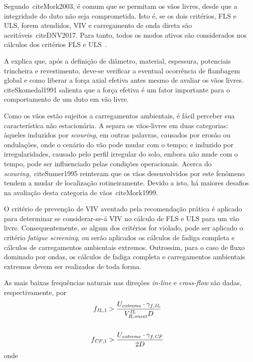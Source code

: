 Segundo~cite{Mork2003}, é comum que se permitam os vãos livres, desde que a integridade do duto não seja comprometida.
Isto é, se os dois critérios, FLS e ULS, forem atendidos, VIV e carregamento de onda direta são aceitáveis~cite{DNV2017}.
Para tanto, todos os modos ativos são considerados nos cálculos dos critérios FLS e ULS~\cite{Mork2003}.

A  explica que, após a definição de diâmetro, material, espessura, potenciais trincheira e revestimento, deve-se verificar a eventual ocorrência de flambagem global e como liberar a força axial efetiva antes mesmo de avaliar os vãos livres.
cite{Skomedal1991} salienta que a força efetiva é um fator importante para o comportamento de um duto em vão livre.

Como os vãos estão sujeitos a carregamentos ambientais, é fácil perceber sua característica não estacionária.
A  separa os vãos-livres em duas categorias: àqueles induzidos por \textit{scouring}, em outras palavras, causados por erosão ou ondulações, onde o cenário do vão pode mudar com o tempo; e induzido por irregularidades, causado pelo perfil irregular do solo, embora não mude com o tempo, pode ser influenciado pelas condições operacionais.
Acerca do \textit{scouring},~cite{Sumer1995} reinteram que os vãos desenvolvidos por este fenômeno tendem a mudar de localização rotineiramente.
Devido a isto, há maiores desafios na avaliação desta categoria de vãos~cite{Mork1999}.

O critério de prevenção de VIV aventado pela recomendação prática é aplicado para determinar se considerar-se-á VIV no cálculo de FLS e ULS para um vão livre.
Consequentemente, se algum dos critérios for violado, pode ser aplicado o critério \textit{fatigue screening}, ou serão aplicados os cálculos de fadiga completa e cálculos de carregamentos ambientais extremos.
Outrossim, para o caso de fluxo dominado por ondas, os cálculos de fadiga completa e carregamentos ambientais extremos devem ser realizados de toda forma.

As mais baixas frequências naturais nas direções \textit{in-line} e \textit{cross-flow} são dadas, respectivamente, por
\begin{equation}
\label{eq:jdsn-ineq}
\begin{aligned}
f_{\mathit{IL},1} &> \frac{U_\mathit{extreme} \cdot \gamma_{f, \mathit{IL}}}{ V_{R, \mathit{onset}}^\mathit{IL} D}\\
\\
f_{\mathit{CF},1} &> \frac{U_\mathit{extreme} \cdot \gamma_{f, \mathit{CF}}}{2 D}
\end{aligned}\\
\end{equation}
onde

